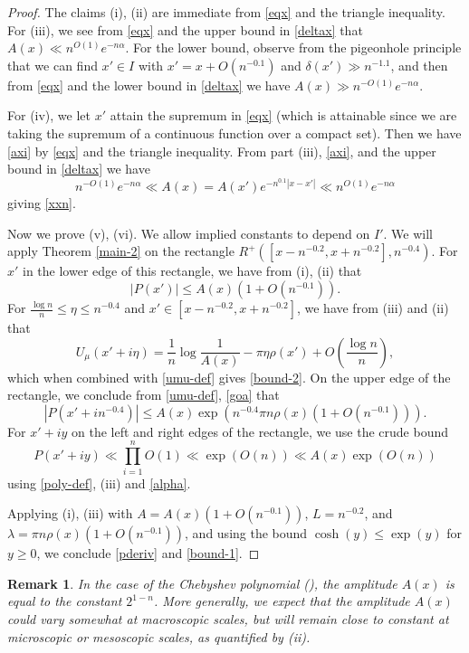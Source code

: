 \documentclass[12pt]{amsart}
\newtheorem{remark}[theorem]{Remark}
\begin{document}
\begin{proof}
The claims (i), (ii) are immediate from \eqref{eqx} and the triangle inequality.  For (iii), we see from \eqref{eqx} and the upper bound in \eqref{deltax} that $A(x) \ll n^{O(1)} e^{-n\alpha}$.  For the lower bound, observe from the pigeonhole principle that we can find $x' \in I$ with $x' = x + O(n^{-0.1})$ and $\delta(x') \gg n^{-1.1}$, and then from \eqref{eqx} and the lower bound in \eqref{deltax} we have $A(x) \gg n^{-O(1)} e^{-n\alpha}$.

For (iv), we let $x'$ attain the supremum in \eqref{eqx} (which is attainable since we are taking the supremum of a continuous function over a compact set).  Then we have \eqref{axi} by \eqref{eqx} and the triangle inequality.  From part (iii), \eqref{axi}, and the upper bound in \eqref{deltax} we have
$$ n^{-O(1)} e^{-n\alpha} \ll A(x) = A(x') e^{-n^{0.1} |x-x'|} \ll n^{O(1)} e^{-n\alpha}$$
giving \eqref{xxn}.

Now we prove (v), (vi).  We allow implied constants to depend on $I'$. We will apply Theorem \ref{main-2} on the rectangle $R^+([x-n^{-0.2}, x+n^{-0.2}], n^{-0.4})$.  For $x'$ in the lower edge of this rectangle, we have from (i), (ii) that
$$ |P(x')| \leq A(x) (1 + O(n^{-0.1})).$$
For $\frac{\log n}{n} \leq \eta \leq n^{-0.4}$ and $x' \in [x-n^{-0.2}, x+n^{-0.2}]$,
we have from (iii) and (ii) that
$$ U_\mu(x' + i \eta) = \frac{1}{n} \log \frac{1}{A(x)} - \pi \eta \rho(x') + O\left(\frac{\log n}{n}\right),$$
which when combined with \eqref{umu-def} gives \eqref{bound-2}.  On the upper edge of the rectangle, we conclude from \eqref{umu-def}, \eqref{goa} that
$$ |P(x'+in^{-0.4})| \leq A(x) \exp( n^{-0.4} \pi n \rho(x) (1 + O(n^{-0.1}))).$$
For $x'+iy$ on the left and right edges of the rectangle, we use the crude bound
$$P(x'+iy) \ll \prod_{i=1}^n O(1) \ll \exp(O(n)) \ll A(x) \exp( O(n ) )$$
using \eqref{poly-def}, (iii) and \eqref{alpha}.

Applying (i), (iii) with $A = A(x) (1 + O(n^{-0.1}))$, $L = n^{-0.2}$, and $\lambda = \pi n \rho(x) (1 + O(n^{-0.1}))$, and using the bound $\cosh(y) \leq \exp(y)$ for $y \geq 0$, we conclude \eqref{pderiv} and \eqref{bound-1}.
\end{proof}



\begin{remark}\label{rem-amp} In the case of the Chebyshev polynomial (), the amplitude $A(x)$ is equal to the constant $2^{1-n}$.  More generally, we expect that the amplitude $A(x)$ could vary somewhat at macroscopic scales, but will remain close to constant at microscopic or mesoscopic scales, as quantified by (ii).
\end{remark}
\end{document}
